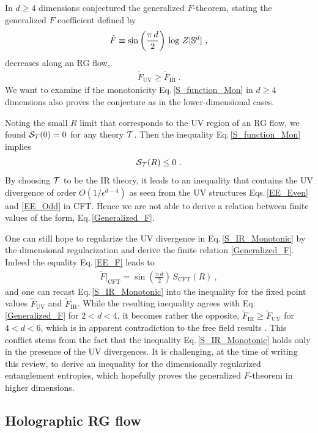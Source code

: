 In $d\ge 4$ dimensions \textcite{Giombi:2014xxa} conjectured the generalized $F$-theorem, stating the generalized $F$ coefficient defined by
\begin{align}
	\tilde F \equiv \sin \left( \frac{\pi\,d}{2}\right)\, \log\,Z[\mathbb{S}^d] \ ,
\end{align}
decreases along an RG flow,
\begin{align}\label{Generalized_F}
	\tilde F_\text{UV} \ge \tilde F_\text{IR} \ .
\end{align}
We want to examine if the monotonicity Eq.\,\eqref{S_function_Mon} in $d\ge 4$ dimensions also proves the conjecture as in the lower-dimensional cases.

Noting the small $R$ limit that corresponds to the UV region of an RG flow, we found ${\cal S}_{\cal T} (0) = 0$ for any theory ${\cal T}$.
Then the inequality Eq.\,\eqref{S_function_Mon} implies
\begin{align}\label{S_IR_Monotonic}
	{\cal S}_{\cal T} (R) \le 0 \ .
\end{align}
By choosing ${\cal T}$ to be the IR theory, it leads to an inequality that contains the UV divergence of order $O(1/\epsilon^{d-4})$ as seen from the UV structures Eqs.\,\eqref{EE_Even} and \eqref{EE_Odd} in CFT.
Hence we are not able to derive a relation between finite values of the form, Eq.\,\eqref{Generalized_F}.

One can still hope to regularize the UV divergence in Eq.\,\eqref{S_IR_Monotonic} by the dimensional regularization and derive the finite relation \eqref{Generalized_F}.
Indeed the equality Eq.\,\eqref{EE_F} leads to
\begin{align}
	\tilde F|_\text{CFT} = \sin \left( \frac{\pi\,d}{2}\right)\, S_\text{CFT}(R) \ ,
\end{align}
and one can recast Eq.\,\eqref{S_IR_Monotonic} into the inequality for the fixed point values $\tilde F_\text{UV}$ and $\tilde F_\text{IR}$.
While the resulting inequality agrees with Eq.\,\eqref{Generalized_F} for $2< d < 4$, it becomes rather the opposite, $\tilde F_\text{IR} \ge \tilde F_\text{UV}$ for $4 < d < 6$, which is in apparent contradiction to the free field results \cite{Giombi:2014xxa}.
This conflict stems from the fact that the inequality Eq.\,\eqref{S_IR_Monotonic} holds only in the presence of the UV divergences.
It is challenging, at the time of writing this review, to derive an inequality for the dimensionally regularized entanglement entropies, which hopefully proves the generalized $F$-theorem in higher dimensions.


\subsection{Holographic RG flow}

